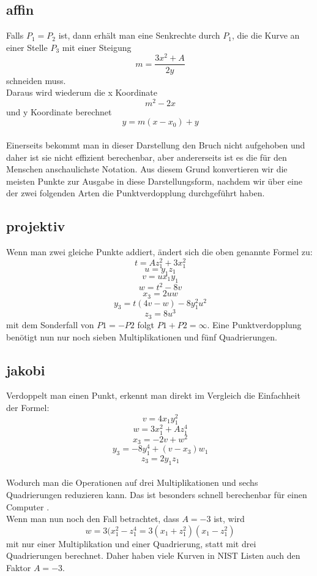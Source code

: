 \subsection{affin}
Falls \(P_1 = P_2\) ist, dann erhält man eine Senkrechte durch \(P_1\), die die Kurve an einer Stelle \(P_3\) mit einer Steigung \[m = \frac{3x^2+A}{2y}\] schneiden muss.\\
Daraus wird wiederum die x Koordinate \[m^2-2x\] und y Koordinate berechnet \[y = m(x - x_0)+y\]\\ Einerseits bekommt man in dieser Darstellung den Bruch nicht aufgehoben und daher ist sie nicht effizient berechenbar, aber andererseits ist es die für den Menschen anschaulichste Notation. Aus diesem Grund konvertieren wir die meisten Punkte zur Ausgabe in diese Darstellungsform, nachdem wir über eine der zwei folgenden Arten die Punktverdopplung durchgeführt haben.
\subsection{projektiv}
Wenn man zwei gleiche Punkte addiert, ändert sich die oben genannte Formel zu:
\[t = Az_1^2 + 3x_1^2\] \[u = y_1z_1\] \[v = ux_1y_1\] \[w = t^2 - 8v\] \[x_3 = 2uw\] \[y_3 = t(4v-w)- 8y_1^2u^2\] \[z_3 = 8u^3\] mit dem Sonderfall von \(P1 = -P2\) folgt \(P1 + P2 = \infty\). Eine Punktverdopplung benötigt nun nur noch sieben Multiplikationen und fünf Quadrierungen.
\subsection{jakobi}
Verdoppelt man einen Punkt, erkennt man direkt im Vergleich die Einfachheit der Formel:
\[v = 4x_1y_1^2\] \[w = 3x_1^2 + Az_1^4\] \[x_3 = -2v + w^2\] \[y_3 = -8y_1^4 + (v-x_3)w_1\] \[z_3 = 2y_1z_1\]\\ 
Wodurch man die Operationen auf drei Multiplikationen und sechs Quadrierungen reduzieren kann. Das ist besonders schnell berechenbar für einen Computer \cite{Washington2003}.\\
Wenn man nun noch den Fall betrachtet, dass \(A = -3\) ist, wird \[w = 3(x_1^2 - z_1^4 = 3(x_1 + z_1^2)(x_1 - z_1^2)\] mit nur einer Multiplikation und einer Quadrierung, statt mit drei Quadrierungen berechnet. Daher haben viele Kurven in NIST Listen auch den Faktor \(A = -3\).